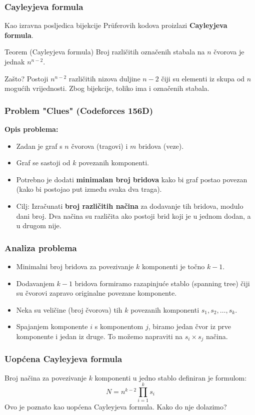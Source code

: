 \documentclass{beamer}
\begin{document}
\begin{frame}
\frametitle{Cayleyjeva formula}
Kao izravna posljedica bijekcije Prüferovih kodova proizlazi \textbf{Cayleyjeva formula}.
\vspace{0.5cm}
\begin{block}{Teorem (Cayleyjeva formula)}
Broj različitih označenih stabala na $n$ čvorova je jednak $n^{n-2}$.
\end{block}
\vspace{0.5cm}
Zašto? Postoji $n^{n-2}$ različitih nizova duljine $n-2$ čiji su elementi iz skupa od $n$ mogućih vrijednosti. Zbog bijekcije, toliko ima i označenih stabala.
\end{frame}

\begin{frame}
\frametitle{Problem "Clues" (Codeforces 156D)}
\textbf{Opis problema:}
\begin{itemize}
    \item Zadan je graf s $n$ čvorova (tragovi) i $m$ bridova (veze).
    \item Graf se sastoji od $k$ povezanih komponenti.
    \item Potrebno je dodati \textbf{minimalan broj bridova} kako bi graf postao povezan (kako bi postojao put između svaka dva traga).
    \item Cilj: Izračunati \textbf{broj različitih načina} za dodavanje tih bridova, modulo dani broj. Dva načina su različita ako postoji brid koji je u jednom dodan, a u drugom nije.
\end{itemize}
\end{frame}

\begin{frame}
\frametitle{Analiza problema}
\begin{itemize}
    \item Minimalni broj bridova za povezivanje $k$ komponenti je točno $k - 1$.
    \item Dodavanjem $k-1$ bridova formiramo razapinjuće stablo (spanning tree) čiji su čvorovi zapravo originalne povezane komponente.
    \item Neka su veličine (broj čvorova) tih $k$ povezanih komponenti $s_1, s_2, \dots, s_k$.
    \item Spajanjem komponente $i$ s komponentom $j$, biramo jedan čvor iz prve komponente i jedan iz druge. To možemo napraviti na $s_i \times s_j$ načina.
\end{itemize}
\end{frame}

\begin{frame}
\frametitle{Uopćena Cayleyjeva formula}
Broj načina za povezivanje $k$ komponenti u jedno stablo definiran je formulom:
\[ N = n^{k-2} \prod_{i=1}^k s_i \]
\vspace{0.2cm}
Ovo je poznato kao uopćena Cayleyjeva formula. Kako do nje dolazimo?
\end{frame}
\end{document}
